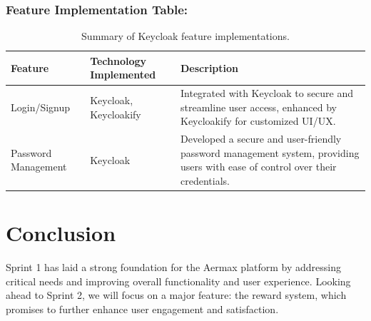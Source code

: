 \subsubsection{Feature Implementation Table:}
\begin{table}[H]
\centering
\begin{tabularx}{\textwidth}{|X|X|X|}
\hline
\textbf{Feature} & \textbf{Technology Implemented} & \textbf{Description} \\
\hline
Login/Signup & Keycloak, Keycloakify & Integrated with Keycloak to secure and streamline user access, enhanced by Keycloakify for customized UI/UX. \\
\hline
Password Management & Keycloak & Developed a secure and user-friendly password management system, providing users with ease of control over their credentials. \\
\hline
\end{tabularx}
\caption{Summary of Keycloak feature implementations.}
\label{tab:keycloak_features}
\end{table}


\section{Conclusion}
Sprint 1 has laid a strong foundation for the Aermax platform by addressing critical needs and improving overall functionality and user experience. Looking ahead to Sprint 2, we will focus on a major feature: the reward system, which promises to further enhance user engagement and satisfaction.

